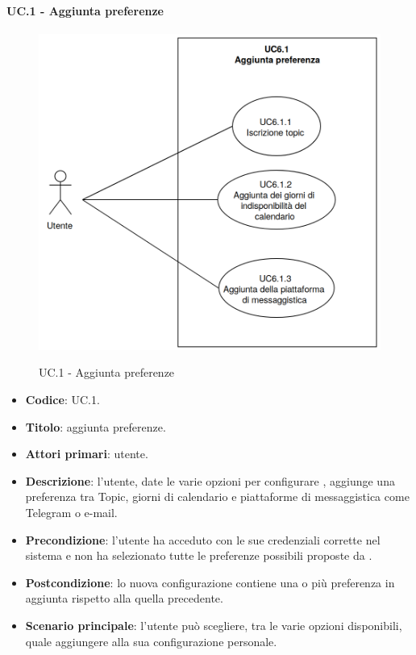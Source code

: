 	\paragraph{UC\theuccount.1 - Aggiunta preferenze}
		\begin{figure}[H]
			\centering
			\includegraphics[width=\columnwidth]{img/UC6_1.png}\\
			\caption{UC\theuccount.1 - Aggiunta preferenze}
		\end{figure}
	\begin{itemize}
		\item \textbf{Codice}: UC\theuccount.1.
		\item \textbf{Titolo}: aggiunta preferenze.
		\item \textbf{Attori primari}: utente.
		\item \textbf{Descrizione}: l'utente, date le varie opzioni per configurare \progetto, aggiunge una preferenza tra Topic, giorni di calendario e piattaforme di messaggistica come Telegram o e-mail.
		\item \textbf{Precondizione}: l'utente ha acceduto con le sue credenziali corrette nel sistema e non ha selezionato tutte le preferenze possibili proposte da \progetto.
		\item \textbf{Postcondizione}: lo nuova configurazione contiene una o più preferenza in aggiunta rispetto alla quella precedente.
		\item \textbf{Scenario principale}: l'utente può scegliere, tra le varie opzioni disponibili, quale aggiungere alla sua configurazione personale.
	\end{itemize}
	
